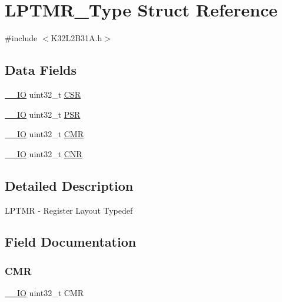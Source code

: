 \hypertarget{struct_l_p_t_m_r___type}{}\section{L\+P\+T\+M\+R\+\_\+\+Type Struct Reference}
\label{struct_l_p_t_m_r___type}


{\ttfamily \#include $<$K32\+L2\+B31\+A.\+h$>$}

\subsection*{Data Fields}
\begin{DoxyCompactItemize}
\item 
\mbox{\hyperlink{core__cm0plus_8h_aec43007d9998a0a0e01faede4133d6be}{\+\_\+\+\_\+\+IO}} uint32\+\_\+t \mbox{\hyperlink{struct_l_p_t_m_r___type_a876dd0a8546697065f406b7543e27af2}{C\+SR}}
\item 
\mbox{\hyperlink{core__cm0plus_8h_aec43007d9998a0a0e01faede4133d6be}{\+\_\+\+\_\+\+IO}} uint32\+\_\+t \mbox{\hyperlink{struct_l_p_t_m_r___type_a909d70d4d88dd6731a07b76a21c8214b}{P\+SR}}
\item 
\mbox{\hyperlink{core__cm0plus_8h_aec43007d9998a0a0e01faede4133d6be}{\+\_\+\+\_\+\+IO}} uint32\+\_\+t \mbox{\hyperlink{struct_l_p_t_m_r___type_a3fbfa42319981886e98899e3ee069f81}{C\+MR}}
\item 
\mbox{\hyperlink{core__cm0plus_8h_aec43007d9998a0a0e01faede4133d6be}{\+\_\+\+\_\+\+IO}} uint32\+\_\+t \mbox{\hyperlink{struct_l_p_t_m_r___type_afabfe869c2da8a9974cac1da36481312}{C\+NR}}
\end{DoxyCompactItemize}


\subsection{Detailed Description}
L\+P\+T\+MR -\/ Register Layout Typedef 

\subsection{Field Documentation}
\mbox{\label{struct_l_p_t_m_r___type_a3fbfa42319981886e98899e3ee069f81}} 
\subsubsection{\texorpdfstring{CMR}{CMR}}
{\footnotesize\ttfamily \mbox{\hyperlink{core__cm0plus_8h_aec43007d9998a0a0e01faede4133d6be}{\+\_\+\+\_\+\+IO}} uint32\+\_\+t C\+MR}

